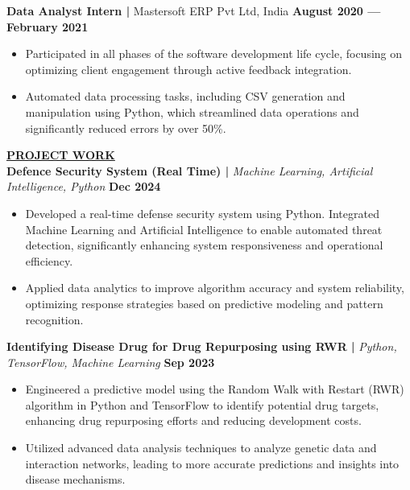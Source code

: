 \documentclass{article}
\begin{document}
\noindent \textbf{Data Analyst Intern | } Mastersoft ERP Pvt Ltd, India \hfill \textbf{August 2020 — February 2021}
\begin{itemize}[noitemsep,nolistsep,leftmargin=*]
\item {\small Participated in all phases of the software development life cycle, focusing on optimizing client engagement through active feedback integration.}
\item {\small Automated data processing tasks, including CSV generation and manipulation using Python, which streamlined data operations and significantly reduced errors by over 50\%.}\\
\end{itemize}
%
%


\noindent \textbf{\underline{PROJECT WORK}} \\
\noindent \textbf{Defence Security System (Real Time) | } \textit{Machine Learning, Artificial Intelligence, Python} \hfill \textbf{Dec 2024}
\begin{itemize}[noitemsep,nolistsep,leftmargin=*]
\item {\small Developed a real-time defense security system using Python. Integrated Machine Learning and Artificial Intelligence to enable automated threat detection, significantly enhancing system responsiveness and operational efficiency.}
\item {\small Applied data analytics to improve algorithm accuracy and system reliability, optimizing response strategies based on predictive modeling and pattern recognition.}
\end{itemize}

\noindent \textbf{Identifying Disease Drug for Drug Repurposing using RWR | } \textit{Python, TensorFlow, Machine Learning} \hfill \textbf{Sep 2023}
\begin{itemize}[noitemsep,nolistsep,leftmargin=*]
\item {\small Engineered a predictive model using the Random Walk with Restart (RWR) algorithm in Python and TensorFlow to identify potential drug targets, enhancing drug repurposing efforts and reducing development costs.}
\item {\small Utilized advanced data analysis techniques to analyze genetic data and interaction networks, leading to more accurate predictions and insights into disease mechanisms.}
\end{itemize}
\end{document}
